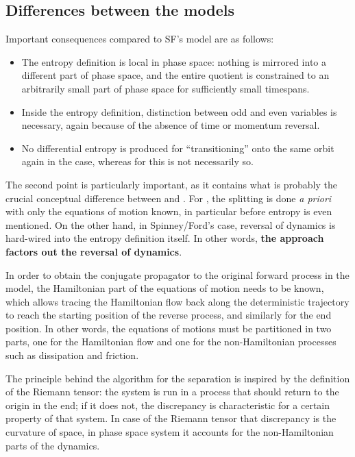 \subsection{Differences between the models}



Important consequences compared to SF's model are as follows:
%
\begin{itemize}
	\item The \HF{} entropy definition is local in phase space: nothing is mirrored into a different part of phase space, and the entire quotient is constrained to an arbitrarily small part of phase space for sufficiently small timespans.
	\item Inside the \HF{} entropy definition, distinction between odd and even variables is necessary, again because of the absence of time or momentum reversal.
	\item No differential entropy is produced for ``transitioning'' onto the same orbit again in the \HF{} case, whereas for \SF{} this is not necessarily so.
\end{itemize}

The second point is particularly important, as it contains what is probably the crucial conceptual difference between \HF{} and \SF{}. For \HF{}, the splitting is done \emph{a priori} with only the equations of motion known, in particular before entropy is even mentioned. On the other hand, in Spinney/Ford's case, reversal of dynamics is hard-wired into the entropy definition itself. In other words, \textbf{the \HF{} approach factors out the reversal of dynamics}.

In order to obtain the conjugate propagator to the original forward process in the \HF{} model, the Hamiltonian part of the equations of motion needs to be known, which allows tracing the Hamiltonian flow back along the deterministic trajectory to reach the starting position of the reverse process, and similarly for the end position. In other words, the equations of motions must be partitioned in two parts, one for the Hamiltonian flow and one for the non-Hamiltonian processes such as dissipation and friction.

The principle behind the algorithm for the separation is inspired by the definition of the Riemann tensor: the system is run in a process that should return to the origin in the end; if it does not, the discrepancy is characteristic for a certain property of that system. In case of the Riemann tensor that discrepancy is the curvature of space, in phase space system it accounts for the non-Hamiltonian parts of the dynamics.

